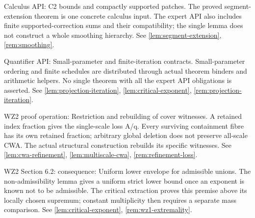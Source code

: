 \begin{remark}
\label{rem:atlas-Icalc}
Calculus API: C2 bounds and compactly supported patches.
The proved segment-extension theorem is one concrete calculus input. The expert API also includes finite supported-correction sums and their compatibility; the single lemma does not construct a whole smoothing hierarchy.
See \ref{lem:segment-extension}, \ref{rem:smoothing}.
\end{remark}

\begin{remark}
\label{rem:atlas-Iparams}
Quantifier API: Small-parameter and finite-iteration contracts.
Small-parameter ordering and finite schedules are distributed through actual theorem binders and arithmetic helpers. No single theorem with all the expert API obligations is asserted.
See \ref{lem:projection-iteration}, \ref{lem:critical-exponent}, \ref{rem:projection-iteration}.
\end{remark}

\begin{remark}
\label{rem:atlas-Iwolffbalance}
WZ2 proof operation: Restriction and rebuilding of cover witnesses.
A retained index fraction gives the single-scale loss A/q. Every surviving containment fibre has its own retained fraction; arbitrary global deletion does not preserve all-scale CWA. The actual structural construction rebuilds its specific witnesses.
See \ref{lem:cwa-refinement}, \ref{lem:multiscale-cwa}, \ref{rem:refinement-loss}.
\end{remark}

\begin{remark}
\label{rem:atlas-Ienvelope}
WZ2 Section 6.2: consequence: Uniform lower envelope for admissible unions.
The non-admissibility lemma gives a uniform strict lower bound once an exponent is known not to be admissible. The critical extraction proves this premise above its locally chosen supremum; constant multiplicity then requires a separate mass comparison.
See \ref{lem:critical-exponent}, \ref{rem:wz1-extremality}.
\end{remark}
